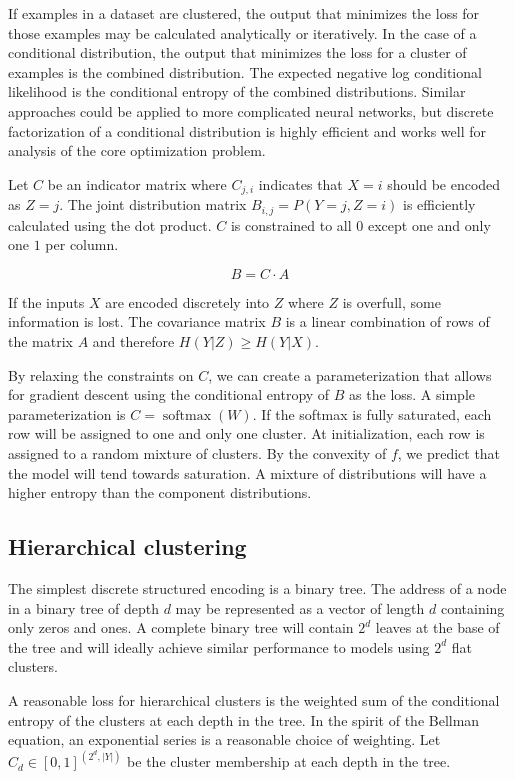 \documentclass[11pt,letterpaper]{article}
\begin{document}
If examples in a dataset are clustered, the output that minimizes the loss for those examples may be calculated analytically or iteratively. In the case of a conditional distribution, the output that minimizes the loss for a cluster of examples is the combined distribution. The expected negative log conditional likelihood is the conditional entropy of the combined distributions. Similar approaches could be applied to more complicated neural networks, but discrete factorization of a conditional distribution is highly efficient and works well for analysis of the core optimization problem.

Let $C$ be an indicator matrix where $C_{j,i}$ indicates that $X=i$ should be encoded as $Z=j$. The joint distribution matrix $B_{i,j}=P(Y=j,Z=i)$ is efficiently calculated using the dot product. $C$ is constrained to all $0$ except one and only one $1$ per column.

$$B = C \cdot A $$ 

If the inputs $X$ are encoded discretely into $Z$ where $Z$ is overfull, some information is lost.  The covariance matrix $B$ is a linear combination of rows of the matrix $A$ and therefore $H(Y|Z) \ge H(Y|X)$. 

By relaxing the constraints on $C$, we can create a parameterization that allows for gradient descent using the conditional entropy of $B$ as the loss. A simple parameterization
is $C=\operatorname{softmax}(W)$. If the softmax is fully saturated, each row will be assigned to one and only one cluster. At initialization, each row is assigned to a random mixture of clusters. By the convexity of $f$, we predict that the model will tend towards saturation. A mixture of distributions will have a higher entropy than the component distributions.

\subsection{Hierarchical clustering}

The simplest discrete structured encoding is a binary tree. The address of a node in a binary tree of depth $d$ may be represented as a vector of length $d$ containing only zeros and ones. A complete binary tree will contain $2^d$ leaves at the base of the tree and will ideally achieve similar performance to models using $2^d$ flat clusters.

A reasonable loss for hierarchical clusters is the weighted sum of the conditional entropy of the clusters at each depth in the tree. In the spirit of the Bellman equation, an exponential series is a reasonable choice of weighting. Let $C_d \in [0,1]^{(2^d, \lvert Y \rvert)}$ be the cluster membership at each depth in the tree.
\end{document}
